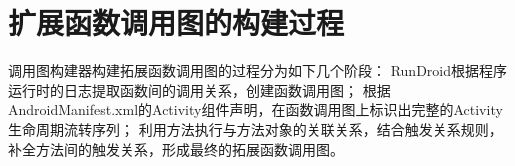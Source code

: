 {\begin{table}[!ht]
{\begin{threeparttable}[b]
\begin{tabular}{|l|c|}
				
				
				
			\end{tabular}
			
			
		\end{threeparttable}
	}
\end{table}
}
\section{扩展函数调用图的构建过程}

调用图构建器构建拓展函数调用图的过程分为如下几个阶段：
 RunDroid根据程序运行时的日志提取函数间的调用关系，创建函数调用图；
根据AndroidManifest.xml的Activity组件声明，在函数调用图上标识出完整的Activity 生命周期流转序列；
利用方法执行与方法对象的关联关系，结合触发关系规则，补全方法间的触发关系，形成最终的拓展函数调用图。




